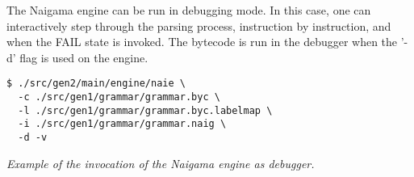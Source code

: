 The Naigama engine can be run in debugging mode. In this case, one can
interactively step through the parsing process, instruction by instruction,
and when the FAIL state is invoked. The bytecode is run in the debugger
when the '-d' flag is used on the engine.

\begin{myquote}
\begin{verbatim}
$ ./src/gen2/main/engine/naie \
  -c ./src/gen1/grammar/grammar.byc \
  -l ./src/gen1/grammar/grammar.byc.labelmap \
  -i ./src/gen1/grammar/grammar.naig \
  -d -v

\end{verbatim}
\end{myquote}
\textit{Example of the invocation of the Naigama engine as debugger.}

